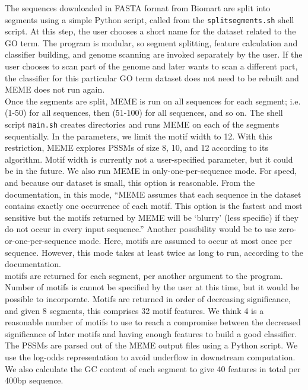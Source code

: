 \documentclass[12pt,letterpaper]{report}
\begin{document}
\indent The sequences downloaded in FASTA format from Biomart are split into segments using a simple Python script, called from the \texttt{splitsegments.sh} shell script. At this step, the user chooses a short name for the dataset related to the GO term. The program is modular, so segment splitting, feature calculation and classifier building, and genome scanning are invoked separately by the user. If the user chooses to scan part of the genome and later wants to scan a different part, the classifier for this particular GO term dataset does not need to be rebuilt and MEME does not run again.\\

\indent Once the segments are split, MEME is run on all sequences for each segment; i.e. (1-50) for all sequences, then (51-100) for all sequences, and so on. The shell script \texttt{main.sh} creates directories and runs MEME on each of the segments sequentially. In the parameters, we limit the motif width to 12. With this restriction, MEME explores PSSMs of size 8, 10, and 12 according to its algorithm. Motif width is currently not a user-specified parameter, but it could be in the future. We also run MEME in only-one-per-sequence mode. For speed, and because our dataset is small, this option is reasonable. From the documentation, in this mode, ``MEME assumes that each sequence in the dataset contains exactly one occurrence of each motif. This option is the fastest and most sensitive but the motifs returned by MEME will be `blurry' (less specific) if they do not occur in every input sequence.'' \cite{meme} Another possibility would be to use zero-or-one-per-sequence mode. Here, motifs are assumed to occur at most once per sequence. However, this mode takes at least twice as long to run, according to the documentation. \\

 motifs are returned for each segment, per another argument to the program. Number of motifs is cannot be specified by the user at this time, but it would be possible to incorporate. Motifs are returned in order of decreasing significance, and given 8 segments, this comprises 32 motif features. We think 4 is a reasonable number of motifs to use to reach a compromise between the decreased significance of later motifs and having enough features to build a good classifier. The PSSMs are parsed out of the MEME output files using a Python script. We use the log-odds representation to avoid underflow in downstream computation. We also calculate the GC content of each segment to give 40 features in total per 400bp sequence. \\
\end{document}
